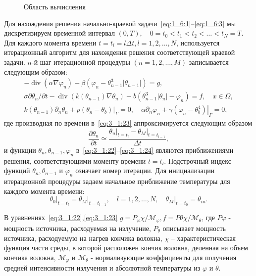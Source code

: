\begin{figure}[h!t]
    \caption{Область вычисления}
    \label{fig:4_3:3}
\end{figure}
Для нахождения решения начально-краевой
задачи~\eqref{eq:1_6:1}--\eqref{eq:1_6:3}
мы дискретизируем временной интервал
$(0, T), \quad 0=t_{0}<t_{1}<t_{2}<\ldots<t_{N}=T$.
Для каждого момента времени $t=t_{l}=l \Delta t, l=1,2, \ldots, N$,
используется итерационный алгоритм для нахождения решения соответствующей
краевой задачи. $n$-й шаг итерационной процедуры $(n=1,2, \ldots, M)$
записывается следующим образом:
\begin{gather}
    -\operatorname{div}\left(\alpha \nabla \varphi_{n}\right)
    +\beta\left(\varphi_{n}-\theta_{n-1}^{3}
    \left|\theta_{n-1}\right|\right)=g, \label{eq:3_1:22}\\
    \sigma \partial \theta_{n} / \partial t
    -\operatorname{div}\left(k\left(\theta_{n-1}\right)
    \nabla \theta_{n}\right)
    -b\left(\theta_{n-1}^{3}\left|\theta_{n}\right|
    -\varphi_{n}\right)=f, \quad x \in \Omega, \label{eq:3_1:23}\\
    k\left(\theta_{n-1}\right) \partial_{n} \theta_{n}
    +\left.p\left(\theta_{n}-\theta_{b}\right)\right|_{\Gamma}=0,
    \quad \alpha \partial_{n} \varphi_{n}+\left.\gamma
    \left(\varphi_{n}-\theta_{b}^{4}\right)\right|_{\Gamma}=0,\label{eq:3_1:24}
\end{gather}
где производная по времени в~\eqref{eq:3_1:23}
аппроксимируется следующим образом
\[
    \frac{\partial \theta_{n}}{\partial t} \simeq
    \frac{
        \left.\theta_{n}\right|_{t=t_{l}}
        -\left.\theta_{M}\right|_{t=t_{l-1}}
    }{\Delta t},
\]
и функции $\theta_{n}, \theta_{n-1}, \varphi_{n}$
в~\eqref{eq:3_1:22}--\eqref{eq:3_1:24} являются приближениями решения,
соответствующими моменту времени $t=t_{l}$.
Подстрочный индекс функций
$\theta_{n}, \theta_{n-1}$ и $\varphi_{n}$ означает номер итерации.
Для инициализации итерационной процедуры задаем начальное приближение
температуры для каждого момента времени:
\begin{equation}
    \label{eq:3_1:25}
    \left.\theta_{0}\right|_{t=t_{l}}=
    \left.\theta_{M}\right|_{t=t_{l-1}},
    \quad l=1,2, \ldots, N, \left.\quad
    \theta_{M}\right|_{t=t_{0}}=\theta_{i n}.
\end{equation}

В уравнениях~\eqref{eq:3_1:22},\eqref{eq:3_1:23}
$g=P_{\varphi} \chi / \mathcal{M}_{\varphi},
f=P{\theta} \chi / \mathcal{M}_{\theta}$,
где $P{\varphi}$ - мощность источника, расходуемая на излучение,
$P_{\theta}$ описывает мощность источника, расходуемую на нагрев
кончика волокна, $\chi$ -- характеристическая функция части среды,
в которой расположен кончик волокна, деленная на объем кончика волокна,
$\mathcal{M}_{\varphi}$ и $\mathcal{M}_{\theta}$ - нормализующие коэффициенты
для получения средней интенсивности излучения
и абсолютной температуры из $\varphi$ и $\theta$.

